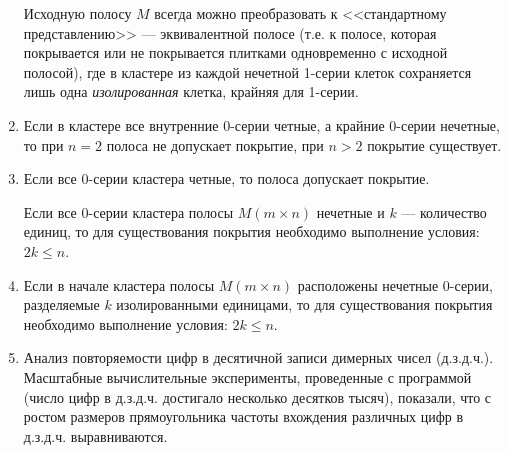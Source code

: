 \begin{enumerate}
Исходную полосу $M$ всегда можно преобразовать к <<стандартному представлению>> --- эквивалентной полосе (т.е. к полосе, которая покрывается или не покрывается плитками одновременно с исходной полосой), где в кластере из каждой нечетной 1-серии клеток сохраняется лишь одна \textit{изолированная}  клетка, крайняя для 1-серии.

\item
Если в кластере все внутренние 0-серии четные, а крайние 0-серии нечетные, то при $n=2$ полоса не допускает покрытие, при $n>2$ покрытие существует.
\item
Если все 0-серии кластера четные, то полоса допускает покрытие. 

Если все 0-серии кластера полосы $M (m\times n)$ нечетные и $k$ ---  количество единиц, то
 для существования покрытия необходимо выполнение условия: $2k\leq n$.
\item
Если в начале кластера полосы $M (m\times n)$ расположены нечетные 0-серии, разделяемые $k$ изолированными единицами, то
 для существования покрытия необходимо выполнение условия: $2k\leq n$.

\item
Анализ повторяемости цифр в десятичной записи димерных чисел (д.з.д.ч.). Масштабные вычислительные эксперименты, проведенные с программой (число цифр в д.з.д.ч. достигало несколько десятков тысяч), показали, что с ростом размеров прямоугольника частоты вхождения различных цифр в д.з.д.ч. выравниваются. 

\end{enumerate}
